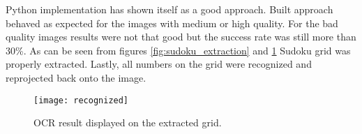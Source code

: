 \documentclass[../../main]{subfiles}
\begin{document}
Python implementation has shown itself as a good approach. Built approach behaved as expected for the images with medium or high quality. For the bad quality images results were not that good but the success rate was still more than 30\%. As can be seen from figures \ref{fig:sudoku_extraction} and \ref{fig:sudoku_ocr} Sudoku grid was properly extracted. Lastly, all numbers on the grid were recognized and reprojected back onto the image.

\begin{figure} [ht!]
    \begin{center}
        \texttt{[image: recognized]}
        \caption{OCR result displayed on the extracted grid.}
        \label{fig:sudoku_ocr}
    \end{center}
\end{figure}
\end{document}
